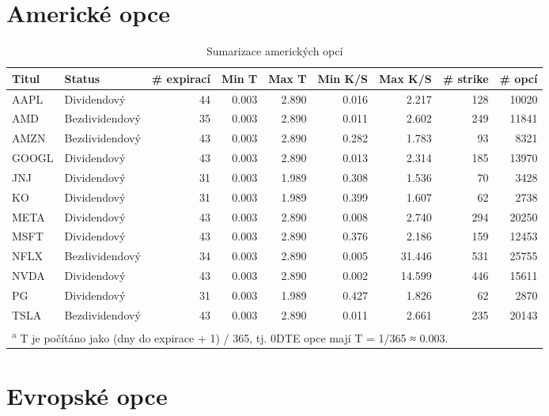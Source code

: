 \section{Americké opce}

\begin{table}[!h]
\centering
\caption{Sumarizace amerických opcí}
\centering
\begin{tabular}[t]{llrrrrrrr}
\toprule
Titul & Status & \# expirací & Min T & Max T & Min K/S & Max K/S & \# strike & \# opcí\\
\midrule
AAPL & Dividendový & 44 & 0.003 & 2.890 & 0.016 & 2.217 & 128 & 10020\\
AMD & Bezdividendový & 35 & 0.003 & 2.890 & 0.011 & 2.602 & 249 & 11841\\
AMZN & Bezdividendový & 43 & 0.003 & 2.890 & 0.282 & 1.783 & 93 & 8321\\
GOOGL & Dividendový & 43 & 0.003 & 2.890 & 0.013 & 2.314 & 185 & 13970\\
JNJ & Dividendový & 31 & 0.003 & 1.989 & 0.308 & 1.536 & 70 & 3428\\
\addlinespace
KO & Dividendový & 31 & 0.003 & 1.989 & 0.399 & 1.607 & 62 & 2738\\
META & Dividendový & 43 & 0.003 & 2.890 & 0.008 & 2.740 & 294 & 20250\\
MSFT & Dividendový & 43 & 0.003 & 2.890 & 0.376 & 2.186 & 159 & 12453\\
NFLX & Bezdividendový & 34 & 0.003 & 2.890 & 0.005 & 31.446 & 531 & 25755\\
NVDA & Dividendový & 43 & 0.003 & 2.890 & 0.002 & 14.599 & 446 & 15611\\
\addlinespace
PG & Dividendový & 31 & 0.003 & 1.989 & 0.427 & 1.826 & 62 & 2870\\
TSLA & Bezdividendový & 43 & 0.003 & 2.890 & 0.011 & 2.661 & 235 & 20143\\
\bottomrule
\multicolumn{9}{l}{\textsuperscript{a} T je počítáno jako (dny do expirace + 1) / 365, tj. 0DTE opce mají T = 1/365 ≈ 0.003.}\\
\end{tabular}
\end{table}


\section{Evropské opce}

